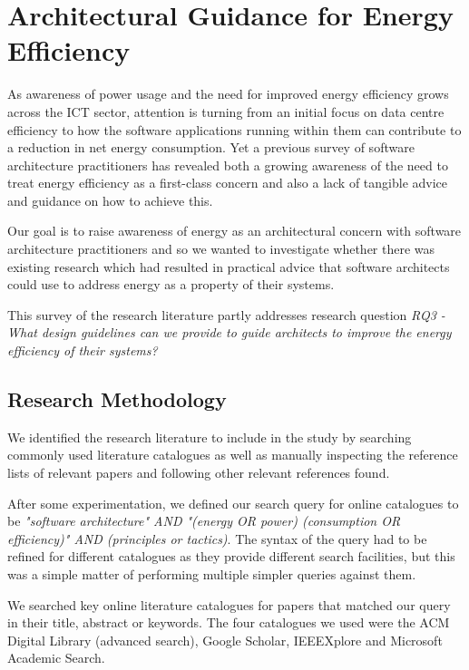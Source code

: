 \section{Architectural Guidance for Energy Efficiency}
\label{section:litreview-energyguidance}


As awareness of power usage and the need for improved energy efficiency grows across the ICT sector, attention is turning from an initial focus on data centre efficiency \cite{delforge2014-datacentreenergy} to how the software applications running within them can contribute to a reduction in net energy consumption.  Yet a previous survey of software architecture practitioners \cite{bashroush2016-datacentreenergy} has revealed both a growing awareness of the need to treat energy efficiency as a first-class concern and also a lack of tangible advice and guidance on how to achieve this.

Our goal is to raise awareness of energy as an architectural concern with software architecture practitioners and so we wanted to investigate whether there was existing research which had resulted in practical advice that software architects could use to address energy as a property of their systems.

This survey of the research literature partly addresses research question \emph{RQ3 -  What design guidelines can we provide to guide architects to improve the energy efficiency of their systems?}

\subsection{Research Methodology}

We identified the research literature to include in the study by searching commonly used literature catalogues as well as manually inspecting the reference lists of relevant papers and following other relevant references found.

After some experimentation, we defined our search query for online catalogues to be \emph{"software architecture" AND "(energy OR power) (consumption OR efficiency)" AND (principles or tactics)}.  The syntax of the query had to be refined for different catalogues as they provide different search facilities, but this was a simple matter of performing multiple simpler queries against them.

We searched key online literature catalogues for papers that matched our query in their title, abstract or keywords.  The four catalogues we used were the ACM Digital Library (advanced search), Google Scholar, IEEEXplore and Microsoft Academic Search.

